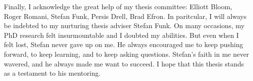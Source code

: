Finally, I acknowledge the great help of my thesis committee:
Elliott Bloom, Roger Romani, Stefan Funk, Persis Drell, Brad Efron.
In paritcular, I will always be indebted to my nurturing thesis adviser
Stefan Funk.  On many occasions, my PhD research felt insurmountable and
I doubted my abilities.  But even when I felt lost, Stefan never gave up
on me. He always encouraged me to keep pushing forward, to keep learning,
and to keep asking questions.  Stefan's faith in me never wavered, and
he always made me want to succeed. I hope that this thesis stands as a
testament to his mentoring.

